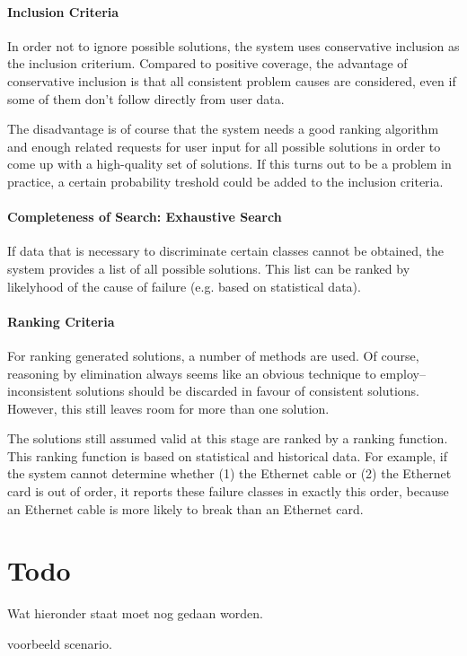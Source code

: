 \documentclass[a4paper,11pt]{article}
\begin{document}
\paragraph{Inclusion Criteria}

In order not to ignore possible solutions, the system uses conservative
inclusion as the inclusion criterium. Compared to positive coverage, the
advantage of conservative inclusion is that all consistent problem causes are
considered, even if some of them don't follow directly from user data.

The disadvantage is of course that the system needs a good ranking algorithm
and enough related requests for user input for all possible solutions in order
to come up with a high-quality set of solutions. If this turns out to be a
problem in practice, a certain probability treshold could be added to the
inclusion criteria.

\paragraph{Completeness of Search: Exhaustive Search}

If data that is necessary to discriminate certain classes cannot be obtained,
the system provides a list of all possible solutions. This list can be ranked
by likelyhood of the cause of failure (e.g. based on statistical data).

\paragraph{Ranking Criteria}

For ranking generated solutions, a number of methods are used. Of course,
reasoning by elimination always seems like an obvious technique to
employ--inconsistent solutions should be discarded in favour of consistent
solutions. However, this still leaves room for more than one solution.

The solutions still assumed valid at this stage are ranked by a ranking
function. This ranking function is based on statistical and historical data.
For example, if the system cannot determine whether (1) the Ethernet cable or
(2) the Ethernet card is out of order, it reports these failure classes in
exactly this order, because an Ethernet cable is more likely to break than an
Ethernet card.


\section*{Todo}

Wat hieronder staat moet nog gedaan worden.

voorbeeld scenario.
\end{document}
